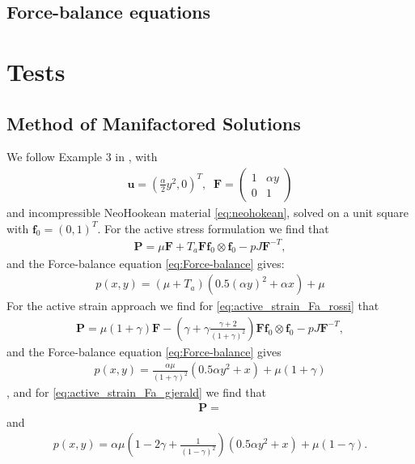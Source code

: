 \documentclass[a4paper,10pt]{article}
\newcommand{\uvec}{\mathbf{u}}
\newcommand{\ef}{\mathbf{f}_0}
\newcommand{\F}{\mathbf{F}}
\newcommand{\FPiola}{\mathbf{P}}
\begin{document}
\subsection{Force-balance equations}


\section{Tests}


\subsection{Method of Manifactored Solutions}
\label{sec:mms2d}

We follow Example 3 in \cite{rossi2012orthotropic}, with
\begin{align}
\uvec  = \left(\frac{\alpha}{2}y^2, 0\right)^T, \;\; \F = \begin{pmatrix} 1 & \alpha y \\ 0 & 1\end{pmatrix}
\end{align}
and incompressible NeoHookean material \eqref{eq:neohokean}, solved on a unit square with $\ef = (0,1)^T$.
For the active stress formulation we find that
\begin{align}
\FPiola = \mu \F + T_a \F  \ef \otimes \ef - pJ\F^{-T}, 
\end{align}
and the Force-balance equation \eqref{eq:Force-balance} gives:
\begin{align}
  p(x,y) = (\mu + T_a)(0.5 ( \alpha y)^2 + \alpha x) + \mu
\end{align}
For the active strain approach we find for \eqref{eq:active_strain_Fa_rossi} that
\begin{align}
\FPiola = \mu(1+\gamma) \F  - \left( \gamma +\gamma \frac{\gamma + 2}{(1+\gamma)^2} \right) \F\ef \otimes \ef - pJ\F^{-T}, 
\end{align}
and the Force-balance equation \eqref{eq:Force-balance} gives
\begin{align}
  p(x,y) = \frac{\alpha \mu}{(1+\gamma)^2}(0.5 \alpha y^2 +  x) + \mu(1+\gamma)
\end{align}, 
and for \eqref{eq:active_strain_Fa_gjerald} we find that
\begin{align}
\FPiola =
\end{align}
and 
\begin{align}
  p(x,y) = \alpha \mu \left(1 - 2\gamma + \frac{1}{(1-\gamma)^2}\right)(0.5  \alpha y^2 +  x) + \mu(1-\gamma).
\end{align}
\end{document}
